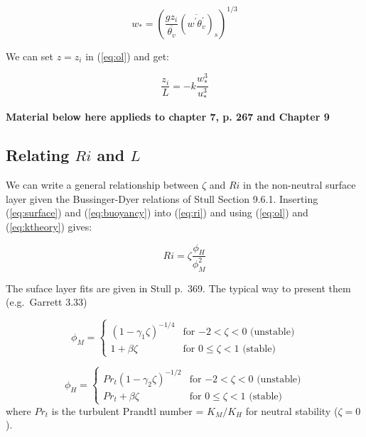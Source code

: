 \documentclass[11pt]{article}
\begin{document}
\begin{equation}
  \label{eq:wstar}
  w_* = \left (  \frac{ g z_i}{\overline{ \theta_v}} \left (  \overline{ w^\prime \theta_v^\prime } \right )_s \right )^{1/3}
\end{equation}

We can set $z=z_i$ in (\ref{eq:ol}) and get:

\begin{equation}
  \label{eq:mo}
  \frac{ z_i}{L} = -k \frac{ w^3_*}{u_*^3} 
\end{equation}

\textbf{Material below here applieds to chapter 7, p. 267 and Chapter 9}

\subsection{Relating $Ri$ and $L$}
\label{sec:relating-ri-l}

We can write  a general relationship between $\zeta$ and $Ri$ in the non-neutral surface
layer given the Bussinger-Dyer relations of Stull Section 9.6.1.  
Inserting  (\ref{eq:surface}) and (\ref{eq:buoyancy}) into (\ref{eq:ri}) and using
(\ref{eq:ol}) and (\ref{eq:ktheory}) gives:

\begin{equation}
  \label{eq:ri-mo}
  Ri = \zeta \frac{ \phi_H}{\phi_M^2} 
\end{equation}

The suface layer fits are given in Stull p.~369.  The typical way to present them
(e.g.~Garrett 3.33)

\begin{equation}
  \label{eq:busdy1}
\phi_M = 
\begin{cases}
   ( 1 - \gamma_1 \zeta )^{-1/4}  &  \text{for $-2 < \zeta < 0$ (unstable)}\\
  1 + \beta \zeta  & \text{for $0 \le \zeta < 1$ (stable)}
\end{cases}
\end{equation}

\begin{equation}
  \label{eq:busdy2}
\phi_H = 
\begin{cases}
  Pr_t ( 1 - \gamma_2 \zeta )^{-1/2}  &  \text{for $-2 < \zeta < 0$ (unstable)}\\
  Pr_t + \beta \zeta  & \text{for $0 \le \zeta < 1$ (stable)}
\end{cases}
\end{equation}
where $Pr_t$ is the turbulent Prandtl number = $K_M/K_H$ for neutral stability ($\zeta=0$).
\end{document}
